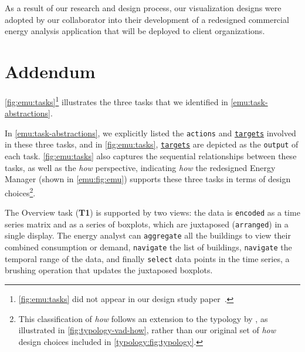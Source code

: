 As a result of our research and design process, our visualization designs were adopted by our collaborator into their development of a redesigned commercial energy analysis application that will be deployed to client organizations.


\section{Addendum}
\label{emu:addendum}

\autoref{fig:emu:tasks}\footnote{\autoref{fig:emu:tasks} did not appear in our design study paper~\cite{Brehmer2015}.} illustrates the three tasks that we identified in \autoref{emu:task-abstractions}.

In \autoref{emu:task-abstractions}, we explicitly listed the {\tt actions} and \underline{{\tt targets}} involved in these three tasks, and in \autoref{fig:emu:tasks}, \underline{{\tt targets}} are depicted as the {\tt output} of each task.
\autoref{fig:emu:tasks} also captures the sequential relationships between these tasks, as well as the {\it how} perspective, indicating {\it how} the redesigned Energy Manager (shown in \autoref{emu:fig:emu}) supports these three tasks in terms of design choices\footnote{This classification of {\it how} follows an extension to the typology by \citet{Munzner2014}, as illustrated in \autoref{fig:typology-vad-how}, rather than our original set of {\it how} design choices included in \autoref{typology:fig:typology}.}.

The Overview task ({\bf T1}) is supported by two views: the data is {\tt encoded} as a time series matrix and as a series of boxplots, which are juxtaposed ({\tt arranged}) in a single display.
The energy analyst can {\tt aggregate} all the buildings to view their combined consumption or demand, {\tt navigate} the list of buildings, {\tt navigate} the temporal range of the data, and finally {\tt select} data points in the time series, a brushing operation that updates the juxtaposed boxplots.

